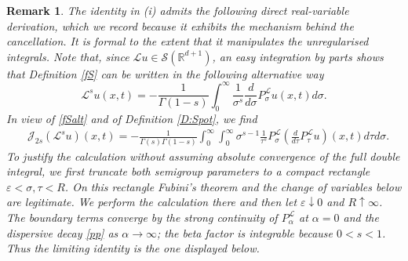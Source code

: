 \documentclass[11pt,letter]{amsart}
\def \R {\mathbb{R}}
\def \G{\Gamma}
\numberwithin{equation}{section}
\newcommand{\Le}{\mathcal L}
\newcommand{\ps}{P_\sigma^{\Le}}
\newtheorem{remark}[theorem]{Remark}
\numberwithin{equation}{section}
\begin{document}
\begin{remark}\label{R:inverse-real}
The identity in (i) admits the following direct real-variable derivation, which
we record because it exhibits the mechanism behind the cancellation. It is
formal to the extent that it manipulates the unregularised integrals.
Note that, since $\Le u\in \mathscr S(\R^{d+1})$,  an easy integration by parts shows that  Definition \eqref{fS} can be written in the following alternative way
\begin{equation}\label{fSalt}
\Le^s u(x,t) = - \frac{1}{\G(1-s)} \int_0^\infty \frac{1}{\sigma^s} \frac{d}{d\sigma} \ps u(x,t) d\sigma.
\end{equation}
In view of \eqref{fSalt} and of Definition \ref{D:Spot}, we find
\begin{align*}
& \mathscr J_{2s}(\Le^s u)(x,t) = - \frac{1}{\G(s)\G(1-s)} \int_0^\infty \int_0^\infty \sigma^{s-1} \frac{1}{\tau^{s}} \ps(\frac{d}{d\tau} P^{\Le}_\tau u)(x,t) d\tau d\sigma.
\end{align*}
To justify the calculation without assuming absolute convergence of the full double integral, we first truncate both semigroup parameters to a compact rectangle $\varepsilon<\sigma,\tau<R$. On this rectangle Fubini's theorem and the change of variables below are legitimate. We perform the calculation there and then let $\varepsilon\downarrow0$ and $R\uparrow\infty$. The boundary terms converge by the strong continuity of $P_\alpha^{\Le}$ at $\alpha=0$ and the dispersive decay \eqref{pp} as $\alpha\to\infty$; the beta factor is integrable because $0<s<1$. Thus the limiting identity is the one displayed below.



\end{remark}
\end{document}
